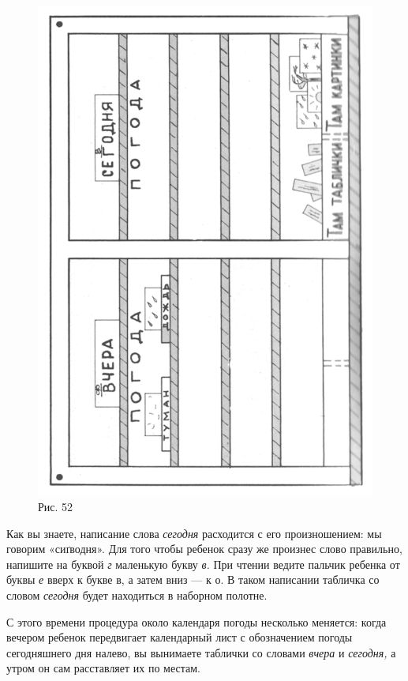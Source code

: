 \documentclass[a5paper]{book}
\renewcommand{\emph}[1]{\textit{#1}}
\begin{document}
\begin{figure}
\centering
\includegraphics[width=0.9\linewidth]{media/media/image48.png}
\caption*{Рис. 52}
\end{figure}


Как вы знаете, написание слова \emph{сегодня} расходится с его
произношением: мы говорим «сиґводня». Для того чтобы ребенок сразу же
произнес слово правильно, напишите на буквой \emph{г} маленькую букву
\emph{в.} При чтении ведите пальчик ребенка от буквы \emph{е} вверх к
букве в, а затем вниз --- к о. В таком написании табличка со словом
\emph{сегодня} будет находиться в наборном полотне.

С этого времени процедура около календаря погоды несколько меняется:
когда вечером ребенок передвигает календарный лист с обозначением погоды
сегодняшнего дня налево, вы вынимаете таблички со словами \emph{вчера} и
\emph{сегодня,} а утром он сам расставляет их по местам.
\end{document}
